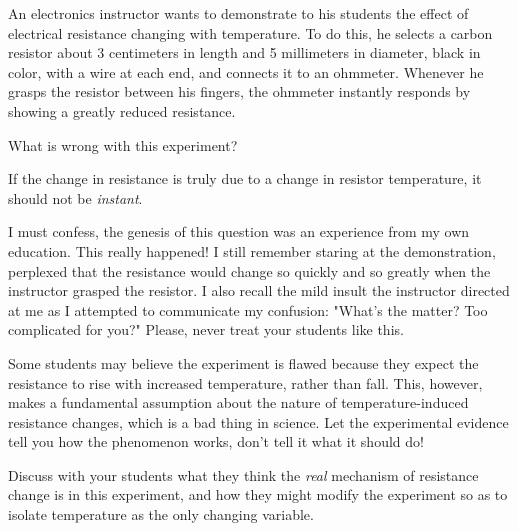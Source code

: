 

An electronics instructor wants to demonstrate to his students the effect of electrical resistance changing with temperature.  To do this, he selects a carbon resistor about 3 centimeters in length and 5 millimeters in diameter, black in color, with a wire at each end, and connects it to an ohmmeter.  Whenever he grasps the resistor between his fingers, the ohmmeter instantly responds by showing a greatly reduced resistance.

What is wrong with this experiment?







If the change in resistance is truly due to a change in resistor temperature, it should not be {\it instant}.







I must confess, the genesis of this question was an experience from my own education.  This really happened!  I still remember staring at the demonstration, perplexed that the resistance would change so quickly and so greatly when the instructor grasped the resistor.  I also recall the mild insult the instructor directed at me as I attempted to communicate my confusion: "What's the matter?  Too complicated for you?"  Please, never treat your students like this.

Some students may believe the experiment is flawed because they expect the resistance to rise with increased temperature, rather than fall.  This, however, makes a fundamental assumption about the nature of temperature-induced resistance changes, which is a bad thing in science.  Let the experimental evidence tell you how the phenomenon works, don't tell it what it should do!

Discuss with your students what they think the {\it real} mechanism of resistance change is in this experiment, and how they might modify the experiment so as to isolate temperature as the only changing variable.




